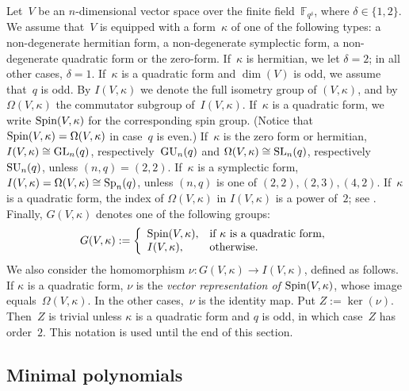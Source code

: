 \documentclass[12pt]{amsart}
\def\GL{ \text{\rm GL} }
\def\GU{ \text{\rm GU} }
\def\Sp{ \text{\rm Sp} }
\def\SL{ \text{\rm SL} }
\def\SU{ \text{\rm SU} }
\def\Spin{ \text{\rm Spin} }
\theoremstyle{theorem}
\theoremstyle{definition}
\theoremstyle{remark}
\begin{document}
Let~$V$ be an $n$-dimensional vector space over the finite 
field~$\mathbb{F}_{q^\delta}$, where $\delta \in \{ 1, 2 \}$. We assume that~$V$
is equipped with a form~$\kappa$ of one of the following types: a non-degenerate
hermitian form, a non-degenerate symplectic form, a non-degenerate quadratic form 
or the zero-form. If~$\kappa$ is hermitian, we let $\delta = 2$; in all other 
cases, $\delta = 1$. If~$\kappa$ is a quadratic form and $\dim(V)$ is odd, we 
assume that~$q$ is odd. By $I( V, \kappa )$ we denote the full isometry group 
of $(V, \kappa )$, and by~$\Omega( V, \kappa )$ the commutator subgroup 
of~$I( V, \kappa )$. If~$\kappa$ is a quadratic form, we write 
$\Spin( V, \kappa )$ for the corresponding spin group. (Notice that 
$\Spin( V, \kappa ) = \Omega( V, \kappa )$ in case~$q$ is even.) If~$\kappa$ is
the zero form or hermitian, $I( V, \kappa ) \cong \GL_n( q )$, 
respectively~$\GU_n( q )$ and $\Omega( V, \kappa ) \cong \SL_n( q )$, 
respectively $\SU_n( q )$, unless $(n,q) = (2,2)$. If~$\kappa$ is a symplectic 
form, $I( V, \kappa ) = \Omega( V, \kappa ) \cong \Sp_n( q )$, unless $(n,q)$ is
one of $(2,2), (2,3), (4,2)$. If~$\kappa$ is a quadratic form, the 
index of $\Omega( V, \kappa )$ in $I( V, \kappa )$ is a power of~$2$; see
\cite[Section~$11$]{Taylor}. Finally, $G( V, \kappa )$ denotes one of the 
following groups:
\begin{equation}
\label{ClassicalGroups}
G( V, \kappa ) := \left\{
       \begin{array}{ll}
               \Spin( V, \kappa ), & \text{if $\kappa$ is a quadratic form}, \\
               I(V, \kappa ), & \text{otherwise}. 
       \end{array}
       \right.
\end{equation}
We also consider the homomorphism
$\nu : G( V, \kappa ) \rightarrow I( V, \kappa )$, defined as follows.
If $\kappa$ is a quadratic form, $\nu$ is the \textit{vector representation of} 
$\Spin( V, \kappa )$, whose image equals~$\Omega( V, \kappa )$. In the other 
cases,~$\nu$ is the identity map. Put $Z := \ker(\nu)$. Then~$Z$ is trivial 
unless $\kappa$ is a quadratic form and $q$ is odd, in which case~$Z$ has 
order~$2$. This notation is used until the end of this section.

\subsection{Minimal polynomials}
\label{MinimalPolynomials}
\end{document}
